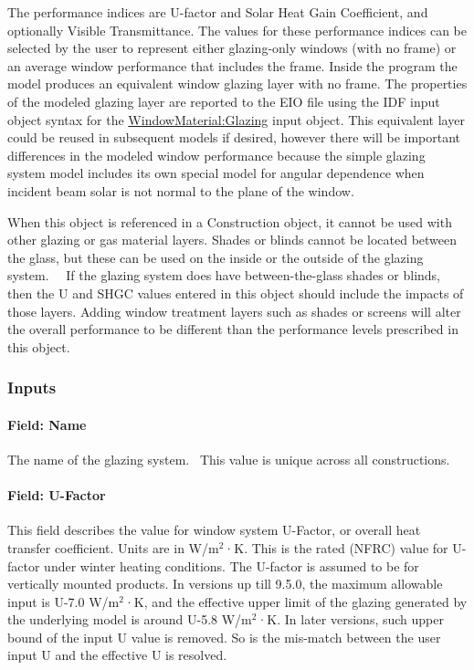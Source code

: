 The performance indices are U-factor and Solar Heat Gain Coefficient, and optionally Visible Transmittance. The values for these performance indices can be selected by the user to represent either glazing-only windows (with no frame) or an average window performance that includes the frame. Inside the program the model produces an equivalent window glazing layer with no frame. The properties of the modeled glazing layer are reported to the EIO file using the IDF input object syntax for the \hyperref[windowmaterialglazing]{WindowMaterial:Glazing} input object. This equivalent layer could be reused in subsequent models if desired, however there will be important differences in the modeled window performance because the simple glazing system model includes its own special model for angular dependence when incident beam solar is not normal to the plane of the window.

When this object is referenced in a Construction object, it cannot be used with other glazing or gas material layers. Shades or blinds cannot be located between the glass, but these can be used on the inside or the outside of the glazing system.~~ If the glazing system does have between-the-glass shades or blinds, then the U and SHGC values entered in this object should include the impacts of those layers. Adding window treatment layers such as shades or screens will alter the overall performance to be different than the performance levels prescribed in this object.

\subsubsection{Inputs}\label{inputs-21-006}

\paragraph{Field: Name}\label{field-name-15-009}

The name of the glazing system.~ This value is unique across all constructions.

\paragraph{Field: U-Factor}\label{field-u-factor}

This field describes the value for window system U-Factor, or overall heat transfer coefficient. Units are in W/m\(^{2}\)·K. This is the rated (NFRC) value for U-factor under winter heating conditions. The U-factor is assumed to be for vertically mounted products.
In versions up till 9.5.0, the maximum allowable input is U-7.0 W/m\(^{2}\)·K,
and the effective upper limit of the glazing generated by the underlying model
is around U-5.8 W/m\(^{2}\)·K. In later versions, such upper bound of the input
U value is removed. So is the mis-match between the user input U and the
effective U is resolved.

